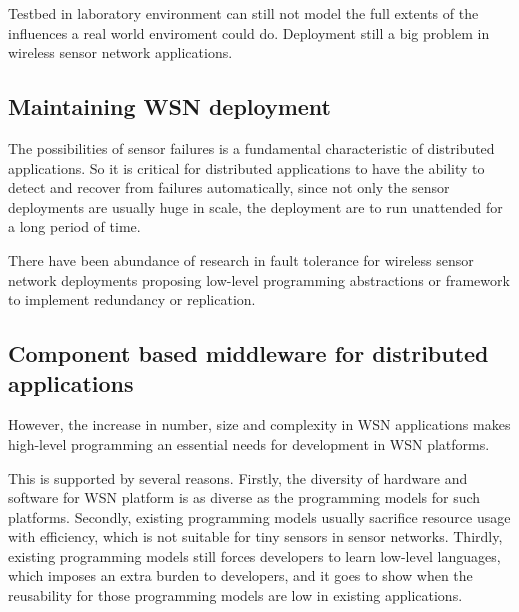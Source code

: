 Testbed in laboratory environment can still not model the full extents of the
influences a real world enviroment could do. Deployment still a big problem in
wireless sensor network applications.

\subsection{Maintaining WSN deployment}



The possibilities of sensor failures is a fundamental characteristic of 
distributed applications. So it is critical for distributed applications to
have the ability to detect and recover from failures automatically, since not
only the sensor deployments are usually huge in scale, the deployment are to
run unattended for a long period of time.

There have been abundance of research in fault tolerance for wireless sensor
network deployments proposing low-level programming abstractions or framework
to implement redundancy or replication.\cite{Whitehouse}\cite{Neumann2010}

\subsection{Component based middleware for distributed applications}


However, the increase in number, size and complexity in WSN applications makes
high-level programming an essential needs for development in WSN platforms.

This is supported by several reasons. Firstly, the diversity of hardware and
software for WSN platform is as diverse as the programming models for such
platforms\cite{Sugihara2008}. Secondly, existing programming models usually
sacrifice resource usage with efficiency, which is not suitable for tiny
sensors in sensor networks. Thirdly, existing programming models still forces
developers to learn low-level languages, which imposes an extra burden to
developers, and it goes to show when the reusability for those programming
models are low in existing applications.

